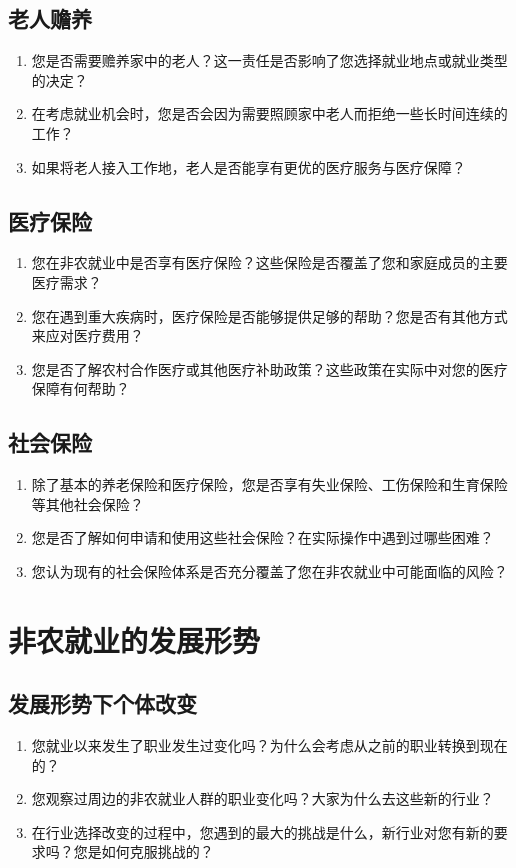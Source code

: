 \documentclass[12pt]{article}
\begin{document}
\subsection*{老人赡养}
\begin{enumerate}
    \item 您是否需要赡养家中的老人？这一责任是否影响了您选择就业地点或就业类型的决定？
    \item 在考虑就业机会时，您是否会因为需要照顾家中老人而拒绝一些长时间连续的工作？
    \item 如果将老人接入工作地，老人是否能享有更优的医疗服务与医疗保障？
\end{enumerate}

\subsection*{医疗保险}
\begin{enumerate}
    \item 您在非农就业中是否享有医疗保险？这些保险是否覆盖了您和家庭成员的主要医疗需求？
    \item 您在遇到重大疾病时，医疗保险是否能够提供足够的帮助？您是否有其他方式来应对医疗费用？
    \item 您是否了解农村合作医疗或其他医疗补助政策？这些政策在实际中对您的医疗保障有何帮助？
\end{enumerate}

\subsection*{社会保险}
\begin{enumerate}
    \item 除了基本的养老保险和医疗保险，您是否享有失业保险、工伤保险和生育保险等其他社会保险？
    \item 您是否了解如何申请和使用这些社会保险？在实际操作中遇到过哪些困难？
    \item 您认为现有的社会保险体系是否充分覆盖了您在非农就业中可能面临的风险？
\end{enumerate}


\section{非农就业的发展形势}

\subsection*{发展形势下个体改变}
\begin{enumerate}
    \item 您就业以来发生了职业发生过变化吗？为什么会考虑从之前的职业转换到现在的？
    \item 您观察过周边的非农就业人群的职业变化吗？大家为什么去这些新的行业？
    \item 在行业选择改变的过程中，您遇到的最大的挑战是什么，新行业对您有新的要求吗？您是如何克服挑战的？
\end{enumerate}
\end{document}
